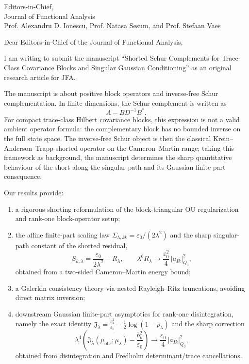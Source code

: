 \documentclass[11pt]{letter}
\begin{document}
\begin{letter}{Editors-in-Chief, \\ Journal of Functional Analysis\\
Prof. Alexandru D. Ionescu, Prof. Natasa Sesum, and Prof. Stefaan Vaes}
\date{2026-06-11}
\opening{Dear Editors-in-Chief of the Journal of Functional Analysis,}

I am writing to submit the manuscript ``Shorted Schur Complements for Trace-Class Covariance Blocks and Singular Gaussian Conditioning'' as an original research article for JFA.

The manuscript is about positive block operators and inverse-free Schur complementation.  In finite dimensions, the Schur complement is written as
\[
A - B D^{-1} B^*.
\]
For compact trace-class Hilbert covariance blocks, this expression is not a valid ambient operator formula: the complementary block has no bounded inverse on the full state space.  The inverse-free Schur object is then the classical Krein--Anderson--Trapp shorted operator on the Cameron--Martin range; taking this framework as background, the manuscript determines the sharp quantitative behaviour of the short along the singular path and its Gaussian finite-part consequence.

Our results provide:
\begin{enumerate}
  \item a rigorous shorting reformulation of the block-triangular OU regularization and rank-one block-operator setup;
  \item the affine finite-part scaling law $\Sigma_{\lambda,kk}=\varepsilon_0/(2\lambda^2)$ and the sharp singular-path constant of the shorted residual,
  \[
  S_{k,\lambda}=\frac{\varepsilon_0}{2\lambda^2}-R_\lambda,\qquad
  \lambda^6 R_\lambda\to\frac{\varepsilon_0^2}{4}\,|a_{Ik}|_{Q_0}^2,
  \]
  obtained from a two-sided Cameron--Martin energy bound;
  \item a Galerkin consistency theory via nested Rayleigh--Ritz truncations, avoiding direct matrix inversion;
  \item downstream Gaussian finite-part asymptotics for rank-one disintegration, namely the exact identity $\mathfrak{J}_\lambda=\frac{b_k^2}{\varepsilon_0}-\frac12\log(1-\rho_\lambda)$ and the sharp correction
  \[
  \lambda^4\!\left(\mathfrak{J}_\lambda(\mu_{\mathrm{obs}};\mu_\lambda)-\frac{b_k^2}{\varepsilon_0}\right)\to\frac{\varepsilon_0}{4}\,|a_{Ik}|_{Q_0}^2,
  \]
  obtained from disintegration and Fredholm determinant/trace cancellations.
\end{enumerate}


\end{letter}
\end{document}
